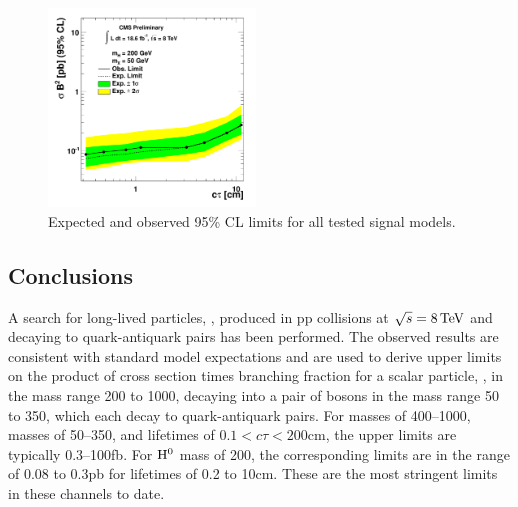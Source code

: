 \begin{figure}[htbp]
\includegraphics[width=0.49\textwidth]{plots/limits/200_50e.pdf}

\caption{Expected and observed 95\% CL limits for all tested signal models.\label{fig:limits}}
\end{figure}



\subsection{Conclusions}
\label{subsec:conclusions}

A search for long-lived particles, \X, produced in pp collisions at $\sqrt{s} = 8\,\text{Te\hspace{-.08em}V}$ and decaying
to quark-antiquark pairs has been performed.
The observed results are consistent with standard model expectations and are used to derive upper
limits on the product of cross section times branching fraction for a scalar particle,
 \Higgs, in the mass range 200 to 1000\GeV, decaying into a pair of \X bosons in the mass
range 50 to 350\GeV, which each decay to quark-antiquark pairs. For \Higgs masses of 400--1000\GeV, \X
masses of 50--350\GeV, and \X lifetimes of $0.1<c\tau<200$\:cm, the upper limits are typically 0.3--100\:fb.
 For $\mathrm{H}^{0}$ mass of 200\GeV, the corresponding limits are in the range of 0.08 to 0.3\:pb for \X
lifetimes of 0.2 to 10\:cm. These are the most stringent limits in these channels to date.
